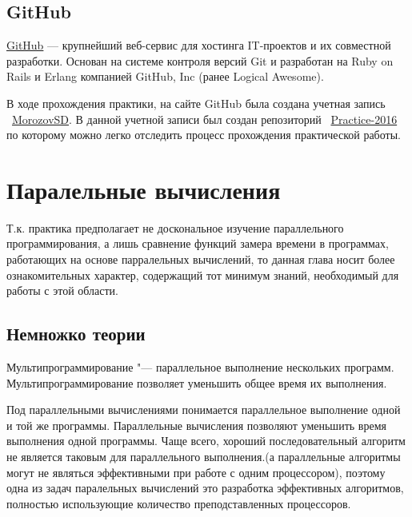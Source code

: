 \documentclass{article}
\begin{document}
		\subsection{GitHub}
			\href{https://github.com/}{GitHub} — крупнейший веб-сервис для хостинга IT-проектов и их совместной разработки. 				Основан на системе контроля	версий Git и разработан на Ruby on Rails и Erlang компанией GitHub, Inc (ранее Logical 					Awesome).
			
			В ходе прохождения практики, на сайте GitHub была создана учетная запись ~\href{https://github.com/MorozovSD}					{MorozovSD}. В данной учетной записи был создан репозиторий ~\href{https://github.com/MorozovSD/Practice-2016}						{Practice-2016} по которому можно легко отследить процесс прохождения практической работы.
	\newpage
	\section{Паралельные вычисления}
		Т.к. практика предполагает не доскональное изучение параллельного программирования, а лишь сравнение функций замера 			времени в программах, работающих на основе парралельных вычислений, то данная глава носит более ознакомительных характер, 			содержащий тот минимум знаний, необходимый для работы с этой области.
		\subsection{Немножко теории}

	
			Мультипрограммирование "--- параллельное выполнение нескольких программ. Мультипрограммирование позволяет уменьшить 			общее время их выполнения.
			
			Под параллельными вычислениями понимается параллельное выполнение одной и той же программы. Параллельные вычисления 			позволяют уменьшить время выполнения одной программы. Чаще всего, хороший последовательный алгоритм не является таковым 			для параллельного выполнения.(а параллельные алгоритмы могут не являться эффективными при работе с одним процессором), 				поэтому одна из задач паралельных вычислений это разработка эффективных алгоритмов, полностью использующие количество 				преподставленных процессоров. 
			
\end{document}
